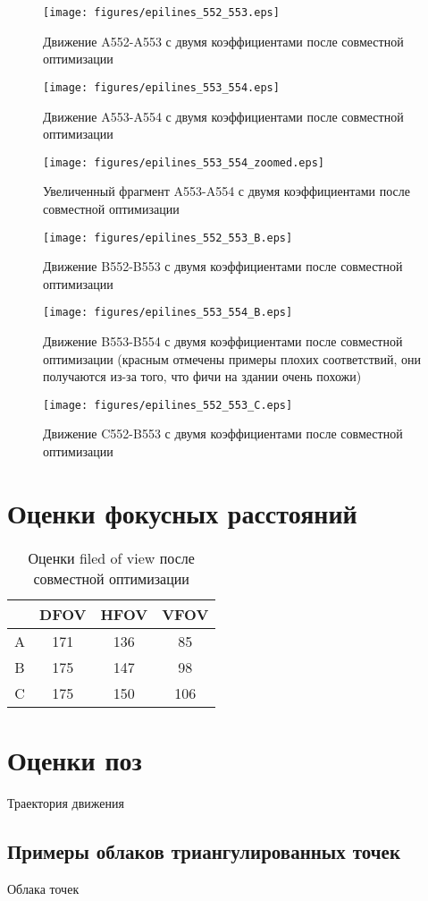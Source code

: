 \begin{figure}[H]
	\centering 
	\texttt{[image: figures/epilines\_552\_553.eps]}
	\caption{Движение A552-A553 с двумя коэффициентами после совместной оптимизации}
\end{figure}
\begin{figure}[H]
	\centering 
	\texttt{[image: figures/epilines\_553\_554.eps]}
	\caption{Движение A553-A554 с двумя коэффициентами после совместной оптимизации}
\end{figure}
\begin{figure}[H]
	\centering 
	\texttt{[image: figures/epilines\_553\_554\_zoomed.eps]}
	\caption{Увеличенный фрагмент A553-A554 с двумя коэффициентами после совместной оптимизации}
\end{figure}
\begin{figure}[H]
	\centering 
	\texttt{[image: figures/epilines\_552\_553\_B.eps]}
	\caption{Движение B552-B553 с двумя коэффициентами после совместной оптимизации}
\end{figure}
\begin{figure}[H]
	\centering 
	\texttt{[image: figures/epilines\_553\_554\_B.eps]}
	\caption{Движение B553-B554 с двумя коэффициентами после совместной оптимизации (красным отмечены примеры плохих соответствий, они получаются из-за того, что фичи на здании очень похожи)}
\end{figure}
\begin{figure}[H]
	\centering 
	\texttt{[image: figures/epilines\_552\_553\_C.eps]}
	\caption{Движение C552-B553 с двумя коэффициентами после совместной оптимизации}
\end{figure}
\section{Оценки фокусных расстояний}
\begin{table}[H]
	\centering
	\begin{tabular}{| c | c | c | c | }
		\hline
		& DFOV & HFOV & VFOV \\ \hline
		A & 171 & 136 & 85 \\ \hline
		B & 175 & 147 & 98 \\ \hline
		C & 175 & 150 & 106 \\
		\hline
	\end{tabular}
	\caption{Оценки filed of view после совместной оптимизации}
\end{table}
\section{Оценки поз}
Траектория движения
\subsection{Примеры облаков триангулированных точек}
Облака точек